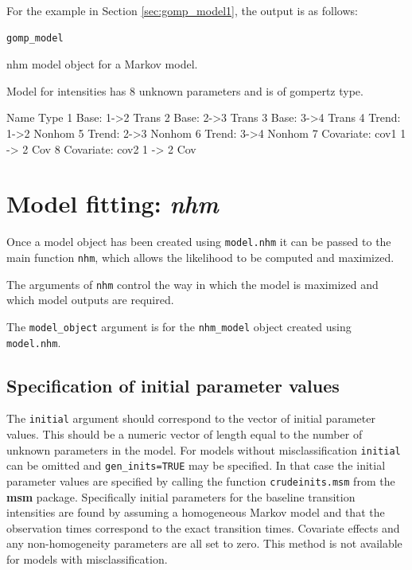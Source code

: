 \documentclass{article}
\numberwithin{equation}{section}
\begin{document}
For the example in Section \ref{sec:gomp_model1}, the output is as follows:

\begin{verbatim}
gomp_model
\end{verbatim}
\begin{verbout}
nhm model object for a Markov model.

Model for intensities has 8 unknown parameters and is of gompertz type.
 
                    Name   Type
1             Base: 1->2  Trans
2             Base: 2->3  Trans
3             Base: 3->4  Trans
4            Trend: 1->2 Nonhom
5            Trend: 2->3 Nonhom
6            Trend: 3->4 Nonhom
7 Covariate: cov1 1 -> 2    Cov
8 Covariate: cov2 1 -> 2    Cov
\end{verbout}


\section{Model fitting: {\it nhm}}

Once a model object has been created using \verb!model.nhm! it can be passed to the main function \verb!nhm!, which allows the likelihood to be computed and maximized. 

The arguments of \verb!nhm! control the way in which the model is maximized and which model outputs are required.

The \verb!model_object! argument is for the \verb!nhm_model! object created using \verb!model.nhm!. 

\subsection{Specification of initial parameter values}

The \verb!initial! argument should correspond to the vector of initial parameter values. This should be a numeric vector of length equal to the number of unknown parameters in the model. For models without misclassification \verb!initial! can be omitted and \verb!gen_inits=TRUE! may be specified. In that case the initial parameter values are specified by calling the function \verb!crudeinits.msm! from the {\bf msm} package. Specifically initial parameters for the baseline transition intensities are found by assuming a homogeneous Markov model and that the observation times correspond to the exact transition times. Covariate effects and any non-homogeneity parameters are all set to zero. This method is not available for models with misclassification.
\end{document}
